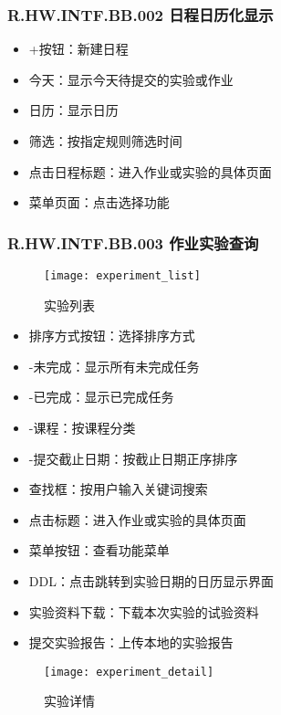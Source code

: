     \subsubsection{R.HW.INTF.BB.002 日程日历化显示}
    \begin{figure}[H]
    \centering
    \caption{}
    \end{figure}
    \begin{itemize}
      \item +按钮：新建日程
      \item 今天：显示今天待提交的实验或作业
      \item 日历：显示日历
      \item 筛选：按指定规则筛选时间
      \item 点击日程标题：进入作业或实验的具体页面
      \item 菜单页面：点击选择功能
    \end{itemize}
    \subsubsection{R.HW.INTF.BB.003 作业实验查询}
    \begin{figure}[H]
    \centering
    \texttt{[image: experiment\_list]}
    \caption{实验列表}
    \end{figure}
    \begin{itemize}
  \item  排序方式按钮：选择排序方式
  \item -未完成：显示所有未完成任务
  \item -已完成：显示已完成任务
  \item -课程：按课程分类
  \item -提交截止日期：按截止日期正序排序
  \item 查找框：按用户输入关键词搜索
  \item 点击标题：进入作业或实验的具体页面
  \item 菜单按钮：查看功能菜单
  \item DDL：点击跳转到实验日期的日历显示界面
  \item 实验资料下载：下载本次实验的试验资料
  \item 提交实验报告：上传本地的实验报告
  \end{itemize}
  \begin{figure}[H]
  \centering
  \texttt{[image: experiment\_detail]}
  \caption{实验详情}
  \end{figure}
